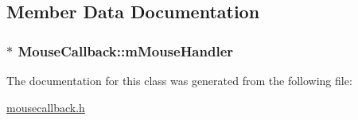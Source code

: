 \subsection{Member Data Documentation}
\hypertarget{classMouseCallback_a6977cef81442eaa57f63d1995b31a240}{}
\subsubsection[{m\+Mouse\+Handler}]{$\ast$ Mouse\+Callback\+::m\+Mouse\+Handler\hspace{0.3cm}{\ttfamily [protected]}}\label{classMouseCallback_a6977cef81442eaa57f63d1995b31a240}


The documentation for this class was generated from the following file\+:\begin{DoxyCompactItemize}
\item 
\hyperlink{mousecallback_8h}{mousecallback.\+h}\end{DoxyCompactItemize}
